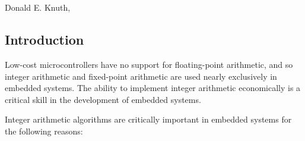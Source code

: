 \chapter[\ccilzeroshorttitle{}]{\ccilzerolongtitle{}}

\label{ccil0}

                     {Donald E. Knuth, \cite[p. 319]{bibref:b:knuthclassic2ndedvol2}}

\section{Introduction}
\label{ccil0:sint0}

Low-cost microcontrollers have no support for floating-point arithmetic,
and so integer arithmetic and fixed-point arithmetic are used nearly exclusively
in embedded systems.  The ability to implement integer arithmetic
economically is a critical skill in the development of embedded
systems.

Integer arithmetic algorithms are critically important in embedded
systems for the following reasons:

